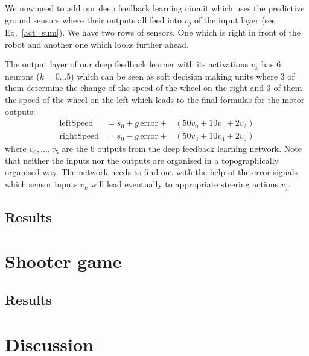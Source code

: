 \documentclass{llncs}
\begin{document}
We now need to add our deep feedback learning circuit which uses the
predictive ground sensors where their outputs all feed into $v_j$ of
the input layer (see Eq.~\ref{act_sum}). We have two rows of sensors. One which
is right in front of the robot and another one which looks further ahead.

The output layer of our deep feedback learner with its activations
$v_k$ has 6 neurons ($k=0 \ldots 5$) which can be seen as soft
decision making units where 3 of them determine the change of the speed of
the wheel on the right and 3 of them the speed of the wheel on the
left which leads to the final formulas for the motor outputs:
\begin{eqnarray}
\mathrm{leftSpeed} &= s_0 + g\, \mathrm{error} + &\left( 50 v_0 + 10 v_1 + 2 v_2 \right) \\
\mathrm{rightSpeed} &= s_0 - g\, \mathrm{error} + &\left( 50 v_3 + 10 v_4 + 2 v_5 \right)
\end{eqnarray}
where $v_0, \ldots, v_5$ are the 6 outputs from the deep feedback learning network.
Note that neither the inputs nor the outputs are organised in a topographically
organised way. The network needs to find out with the help of the error signals
which sensor inputs $v_k$ will lead eventually to appropriate steering actions $v_j$.


\subsection{Results}


\section{Shooter game}


\subsection{Results}


\section{Discussion}




\end{document}
